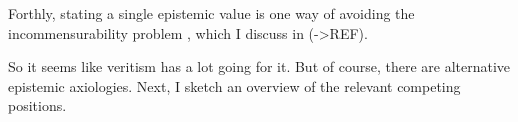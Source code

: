 \documentclass[12pt,numbers=noenddot]{scrartcl}
\begin{document}
Forthly, stating a single epistemic value is one way of avoiding the incommensurability problem \autocite[16]{sep-value-theory}, which I discuss in (->REF).

So it seems like veritism has a lot going for it. But of course, there are alternative epistemic axiologies. Next, I sketch an overview of the relevant competing positions.



\end{document}
